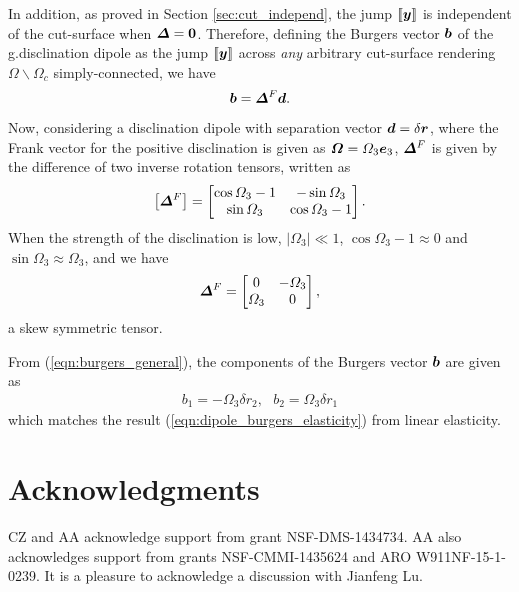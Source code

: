 \documentclass[11pt,letterpaper]{article}
\begin{document}
In addition, as proved in Section \ref{sec:cut_independ}, the jump $\llbracket \bfy \rrbracket$ is independent of the cut-surface when $\bfDelta =\bf0$. Therefore, defining the Burgers vector $\bfb$ of the g.disclination dipole as the jump $\llbracket \bfy \rrbracket$ across \emph{any} arbitrary cut-surface rendering $\Omega \backslash \Omega_c$ simply-connected, we have
\begin{equation}\label{eqn:burgers_general}
\bfb = \bfDelta^F \bfd.
\end{equation}

Now, considering a disclination dipole with separation vector $\bfd = \delta \bfr$, where the Frank vector for the positive disclination is given  as $\bfOmega = \Omega_3 \bfe_3$, $\bfDelta^F$ is given by the difference of two inverse rotation tensors, written as 
\begin{equation*}
\left\lbrack \bfDelta^F \right\rbrack = 
\begin{bmatrix}
\cos \Omega_3-1& -\sin \Omega_3 \\
\sin \Omega_3 & \cos \Omega_3-1 \\
\end{bmatrix}.
\end{equation*}
When the strength of the disclination is low, $|\Omega_3| \ll 1$, $\cos \Omega_3 - 1 \approx 0$ and $\sin \Omega_3 \approx \Omega_3$, and we have
\begin{equation*}
\bfDelta^F = 
\begin{bmatrix}
0& - \Omega_3 \\
 \Omega_3 & 0 \\
\end{bmatrix},
\end{equation*}
a skew symmetric tensor.

From (\ref{eqn:burgers_general}), the components of the Burgers vector $\bfb$ are given as 
\begin{eqnarray*}
b_1 =  -\Omega_3 \delta r_2, \ \ \  b_2 = \Omega_3 \delta r_1 
\end{eqnarray*}
which matches the result (\ref{eqn:dipole_burgers_elasticity}) from linear elasticity. 
\section*{Acknowledgments}
CZ and AA acknowledge support from grant NSF-DMS-1434734. AA also acknowledges support from grants NSF-CMMI-1435624 and ARO W911NF-15-1-0239. It is a pleasure to acknowledge a discussion with Jianfeng Lu.
\end{document}
